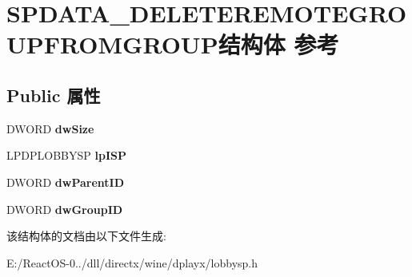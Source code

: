 \hypertarget{struct_s_p_d_a_t_a___d_e_l_e_t_e_r_e_m_o_t_e_g_r_o_u_p_f_r_o_m_g_r_o_u_p}{}\section{S\+P\+D\+A\+T\+A\+\_\+\+D\+E\+L\+E\+T\+E\+R\+E\+M\+O\+T\+E\+G\+R\+O\+U\+P\+F\+R\+O\+M\+G\+R\+O\+U\+P结构体 参考}
\label{struct_s_p_d_a_t_a___d_e_l_e_t_e_r_e_m_o_t_e_g_r_o_u_p_f_r_o_m_g_r_o_u_p}
\subsection*{Public 属性}
\begin{DoxyCompactItemize}
\item 
\mbox{\label{struct_s_p_d_a_t_a___d_e_l_e_t_e_r_e_m_o_t_e_g_r_o_u_p_f_r_o_m_g_r_o_u_p_a6b40f69b0bf1fd57f149918b6e390390}} 
D\+W\+O\+RD {\bfseries dw\+Size}
\item 
\mbox{\label{struct_s_p_d_a_t_a___d_e_l_e_t_e_r_e_m_o_t_e_g_r_o_u_p_f_r_o_m_g_r_o_u_p_aadab92b400d8c1328690ad20e36e9b63}} 
L\+P\+D\+P\+L\+O\+B\+B\+Y\+SP {\bfseries lp\+I\+SP}
\item 
\mbox{\label{struct_s_p_d_a_t_a___d_e_l_e_t_e_r_e_m_o_t_e_g_r_o_u_p_f_r_o_m_g_r_o_u_p_aa7815315214b3940b30e1093905283ba}} 
D\+W\+O\+RD {\bfseries dw\+Parent\+ID}
\item 
\mbox{\label{struct_s_p_d_a_t_a___d_e_l_e_t_e_r_e_m_o_t_e_g_r_o_u_p_f_r_o_m_g_r_o_u_p_a2eb63606dc2bc08f143fd9a4896375f4}} 
D\+W\+O\+RD {\bfseries dw\+Group\+ID}
\end{DoxyCompactItemize}


该结构体的文档由以下文件生成\+:\begin{DoxyCompactItemize}
\item 
E\+:/\+React\+O\+S-\/0../dll/directx/wine/dplayx/lobbysp.\+h\end{DoxyCompactItemize}
